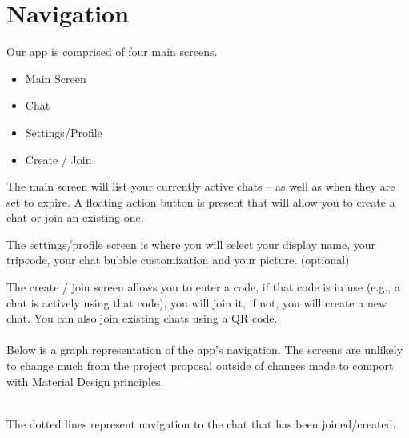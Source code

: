 \documentclass{article}
\begin{document}
\section{Navigation}

Our app is comprised of four main screens.
\begin{itemize}
    \item Main Screen
    \item Chat
    \item Settings/Profile
    \item Create / Join
\end{itemize}

The main screen will list your currently active chats -- as well as when they are set to expire. A floating action button is present that will allow you to create a chat or join an existing one.

The settings/profile screen is where you will select your display name, your tripcode, your chat bubble customization and your picture. (optional)

The create / join screen allows you to enter a code, if that code is in use (e.g., a chat is actively using that code), you will join it, if not, you will create a new chat. You can also join existing chats using a QR code.
\\\\
Below is a graph representation of the app's navigation. The screens are unlikely to change much from the project proposal outside of changes made to comport with Material Design principles.
\\\\

The dotted lines represent navigation to the chat that has been joined/created. \\ \\
\end{document}
